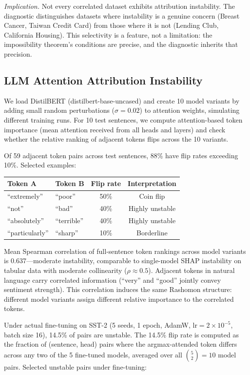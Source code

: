 \documentclass{article}
\begin{document}
\emph{Implication.}
Not every correlated dataset exhibits attribution instability.
The diagnostic distinguishes datasets where instability is a genuine
concern (Breast Cancer, Taiwan Credit Card) from those where it is
not (Lending Club, California Housing). This selectivity is a
feature, not a limitation: the impossibility theorem's conditions are
precise, and the diagnostic inherits that precision.

\subsection{LLM Attention Attribution Instability}

We load DistilBERT (distilbert-base-uncased) and create 10 model variants by adding small random perturbations ($\sigma = 0.02$) to attention weights, simulating different training runs. For 10 test sentences, we compute attention-based token importance (mean attention received from all heads and layers) and check whether the relative ranking of adjacent tokens flips across the 10 variants.

Of 59 adjacent token pairs across test sentences, 88\% have flip rates exceeding 10\%. Selected examples:

\begin{center}
\small
\begin{tabular}{@{}llcc@{}}
\toprule
Token A & Token B & Flip rate & Interpretation \\
\midrule
``extremely'' & ``poor'' & 50\% & Coin flip \\
``not'' & ``bad'' & 40\% & Highly unstable \\
``absolutely'' & ``terrible'' & 40\% & Highly unstable \\
``particularly'' & ``sharp'' & 10\% & Borderline \\
\bottomrule
\end{tabular}
\end{center}

Mean Spearman correlation of full-sentence token rankings across model variants is 0.637---moderate instability, comparable to single-model SHAP instability on tabular data with moderate collinearity ($\rho \approx 0.5$). Adjacent tokens in natural language carry correlated information (``very'' and ``good'' jointly convey sentiment strength). This correlation induces the same Rashomon structure: different model variants assign different relative importance to the correlated tokens.

Under actual fine-tuning on SST-2 (5 seeds, 1 epoch, AdamW, lr$=2{\times}10^{-5}$, batch size 16), 14.5\% of pairs are unstable. The 14.5\% flip rate is computed as the fraction of (sentence, head) pairs where the argmax-attended token differs across any two of the 5 fine-tuned models, averaged over all $\binom{5}{2}=10$ model pairs. Selected unstable pairs under fine-tuning:
\end{document}
